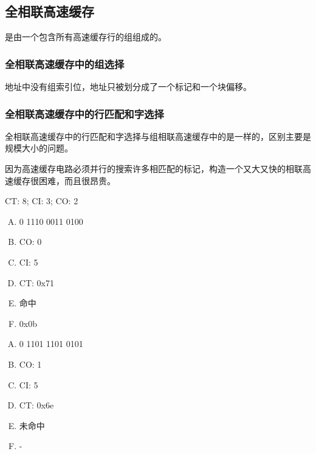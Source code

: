 {    \subsection{全相联高速缓存}
    {
        是由一个包含所有高速缓存行的组组成的。

        \subsubsection{全相联高速缓存中的组选择}
        {
            地址中没有组索引位，地址只被划分成了一个标记和一个块偏移。
        }

        \subsubsection{全相联高速缓存中的行匹配和字选择}
        {
            全相联高速缓存中的行匹配和字选择与组相联高速缓存中的是一样的，区别主要是规模大小的问题。

            因为高速缓存电路必须并行的搜索许多相匹配的标记，构造一个又大又快的相联高速缓存很困难，而且很昂贵。
        }
    }

    \begin{practicec}
        CT: 8; CI: 3; CO: 2
    \end{practicec}

    \begin{practicec}
        \begin{enumerate}[A.]
            \item 0 1110 0011 0100
            \item CO: 0
            \item CI: 5
            \item CT: 0x71
            \item 命中
            \item 0x0b
        \end{enumerate}
    \end{practicec}

    \begin{practicec}
        \begin{enumerate}[A.]
            \item 0 1101 1101 0101
            \item CO: 1
            \item CI: 5
            \item CT: 0x6e
            \item 未命中
            \item -
        \end{enumerate}
    \end{practicec}

}
